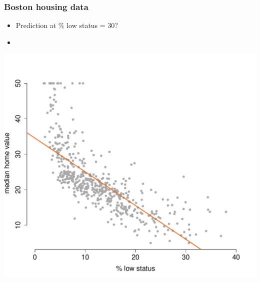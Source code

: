 \documentclass{beamer}
\newcommand{\bo}[1]{\textcolor{burntorange}{#1}}
\begin{document}
\begin{frame}[plain]
\frametitle{Boston housing data}
\vspace{5mm}
\begin{itemize}
\item[] Prediction at \bo{\% low status} = 30? \textcolor{white}{fill}
\item[] \textcolor{white}{fill}
\end{itemize}
\vspace{-16mm}
\begin{center}
\includegraphics[scale=.39]{DaveBostonplot2.pdf}
\end{center}

\end{frame}
\end{document}
